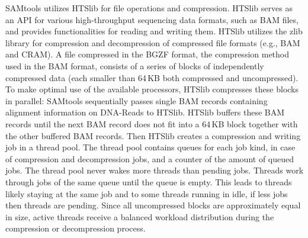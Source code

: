 SAMtools utilizes HTSlib for file operations and compression. HTSlib serves as an API for various high-throughput sequencing data formats, such as BAM files, and  provides functionalities for reading and writing them. HTSlib utilizes the zlib library for compression and decompression of compressed file formats (e.g., BAM and CRAM). A file compressed in the BGZF format, the compression method used in the BAM format, consists of a series of blocks of independently compressed data (each smaller than 64\,KB both compressed and uncompressed). To make optimal use of the available processors, HTSlib compresses these blocks in parallel: SAMtools sequentially passes single BAM records containing alignment information on DNA-Reads to HTSlib. HTSlib buffers these BAM records until the next BAM record does not fit into a 64\,KB block together with the other buffered BAM records. Then HTSlib creates a compression and writing job in a thread pool. The thread pool contains queues for each job kind, in case of \sort compression and decompression jobs, and a counter of the amount of queued jobs. The thread pool never wakes more threads than pending jobs. Threads work through jobs of the same queue until the queue is empty. This leads to threads likely staying at the same job and to some threads running in idle, if less jobs then threads are pending. Since all uncompressed blocks are approximately equal in size, active threads receive a balanced workload distribution during the compression or decompression process.


